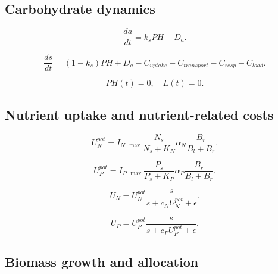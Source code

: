 \documentclass[a4paper,fleqn]{cas-dc}
\begin{document}
\subsection{Carbohydrate dynamics}

\begin{equation}
\frac{da}{dt} =
k_s PH - D_a .
\end{equation}

\begin{equation}
\frac{ds}{dt} =
(1-k_s)PH + D_a
- C_{uptake}
- C_{transport}
- C_{resp}
- C_{load}.
\end{equation}


\begin{equation}
PH(t) = 0, \quad L(t)=0 .
\end{equation}

\subsection{Nutrient uptake and nutrient-related costs}

\begin{equation}
U_N^{pot} =
I_{N,\max}
\frac{N_s}{N_s + K_N}
\alpha_N
\frac{B_r}{B_l+B_r}.
\end{equation}

\begin{equation}
U_P^{pot} =
I_{P,\max}
\frac{P_s}{P_s + K_P}
\alpha_P
\frac{B_r}{B_l+B_r}.
\end{equation}

\begin{equation}
U_N =
U_N^{pot}
\frac{s}
{s + c_N U_N^{pot} + \epsilon}.
\end{equation}

\begin{equation}
U_P =
U_P^{pot}
\frac{s}
{s + c_P U_P^{pot} + \epsilon}.
\end{equation}


\subsection{Biomass growth and allocation}
\end{document}
